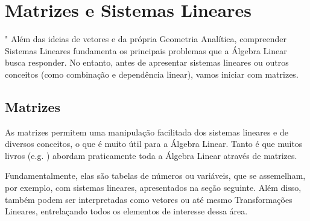 \documentclass[../main.tex]{subfiles}
\begin{document}
	
	\chapter{Matrizes e Sistemas Lineares}"
	Além das ideias de vetores e da própria Geometria Analítica, compreender Sistemas Lineares fundamenta os principais problemas que a Álgebra Linear busca responder. No entanto, antes de apresentar sistemas lineares ou outros conceitos (como combinação e dependência linear), vamos iniciar com matrizes.
	
	\section{Matrizes}
		As matrizes permitem uma manipulação facilitada dos sistemas lineares e de diversos conceitos, o que é muito útil para a Álgebra Linear. Tanto é que muitos livros (e.g. \cite{lay}) abordam praticamente toda a Álgebra Linear através de matrizes.
		
		Fundamentalmente, elas são tabelas de números ou variáveis, que se assemelham, por exemplo, com sistemas lineares, apresentados na seção seguinte. Além disso, também podem ser interpretadas como vetores ou até mesmo Transformações Lineares, entrelaçando todos os elementos de interesse dessa área.
		
\end{document}
